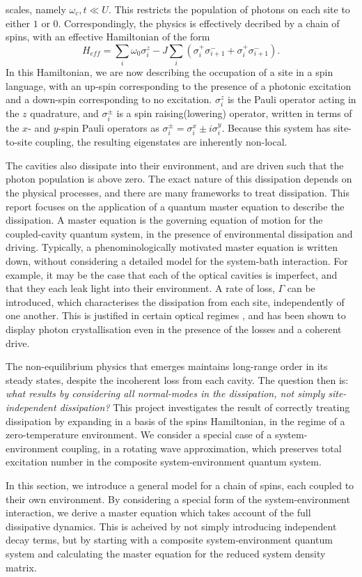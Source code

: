 \documentclass[11pt,a4paper,article,oneside]{memoir}
\begin{document}
scales, namely $\omega_c,t\ll U$. This restricts the population of
photons on each site to either $1$ or $0$.  Correspondingly, the
physics is effectively decribed by a chain of spins, with an effective
Hamiltonian of the form
\begin{equation}
  H_{eff}=\sum_i\omega_0 \sigma^z_i -J \sum_i
  (\sigma^+_i\sigma^-_{i+1}+\sigma^+_i\sigma^-_{i+1}).
\end{equation}
In this Hamiltonian, we are now describing the occupation of a site in
a spin language, with an up-spin corresponding to the presence of a
photonic excitation and a down-spin corresponding to no
excitation. $\sigma^z_i$ is the Pauli operator acting in the $z$
quadrature, and $\sigma^\pm_i$ is a spin raising(lowering) operator,
written in terms of the $x$- and $y$-spin Pauli operators as
$\sigma^\pm_i=\sigma^x_i\pm i\sigma^y_i$. Because this system has
site-to-site coupling, the resulting eigenstates are inherently
non-local.  \par The cavities also dissipate into their environment,
and are driven such that the photon population is above zero. The
exact nature of this dissipation depends on the physical processes,
and there are many frameworks to treat dissipation. This report
focuses on the application of a quantum master equation to describe
the dissipation. A master equation is the governing equation of motion
for the coupled-cavity quantum system, in the presence of
environmental dissipation and driving. Typically, a phenominologically
motivated master equation is written down, without considering a
detailed model for the system-bath interaction. For example, it may be
the case that each of the optical cavities is imperfect, and that they
each leak light into their environment. A rate of loss, $\Gamma$ can
be introduced, which characterises the dissipation from each site,
independently of one another. This is justified in certain optical
regimes \cite{hartmann}, and has been shown to display photon
crystallisation even in the presence of the losses and a coherent
drive.  \par The non-equilibrium physics that emerges maintains
long-range order in its steady states, despite the incoherent loss
from each cavity. The question then is: \textit{what results by
  considering all normal-modes in the dissipation, not simply
  site-independent dissipation?} This project investigates the result
of correctly treating dissipation by expanding in a basis of the spins
Hamiltonian, in the regime of a zero-temperature environment. We
consider a special case of a system-environment coupling, in a
rotating wave approximation, which preserves total excitation number
in the composite system-environment quantum system.  \par \par In this
section, we introduce a general model for a chain of spins, each
coupled to their own environment. By considering a special form of the
system-environment interaction, we derive a master equation which
takes account of the full dissipative dynamics. This is acheived by
not simply introducing independent decay terms, but by starting with a
composite system-environment quantum system and calculating the master
equation for the reduced system density matrix.
%
\end{document}
